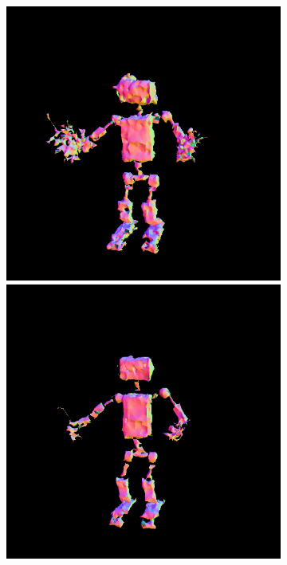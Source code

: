 \begin{figure}[ht]
\begin{subfigure}[b]{0.20\textwidth}
        \includegraphics[width=\textwidth]{etc/a robot made out of plants/fantasia3d_fromMesh/fantasia_coarse_robot_5000_part2.png}
        \includegraphics[width=\textwidth]{etc/a robot made out of plants/fantasia3d_fromMesh/fantasia_coarse_robot_10000_part2.png}

\end{subfigure}
\end{figure}
